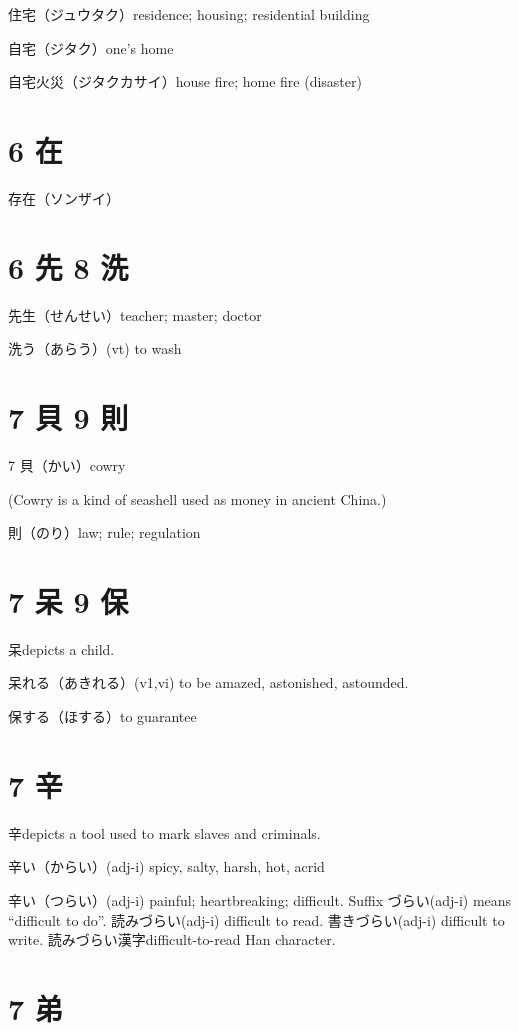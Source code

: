 住宅（ジュウタク）residence; housing; residential building

自宅（ジタク）one's home

自宅火災（ジタクカサイ）house fire; home fire (disaster)

\section{6 在}

存在（ソンザイ）

\section{6 先 8 洗}

先生（せんせい）teacher; master; doctor

洗う（あらう）(vt) to wash

\section{7 貝 9 則}

7 貝（かい）cowry

(Cowry is a kind of seashell used as money in ancient China.)

則（のり）law; rule; regulation

\section{7 呆 9 保}

呆depicts a child.

呆れる（あきれる）(v1,vi) to be amazed, astonished, astounded.

保する（ほする）to guarantee

\section{7 辛}

辛depicts a tool used to mark slaves and criminals.

辛い（からい）(adj-i) spicy, salty, harsh, hot, acrid

辛い（つらい）(adj-i) painful; heartbreaking; difficult.
Suffix づらい(adj-i) means ``difficult to do''.
読みづらい(adj-i) difficult to read.
書きづらい(adj-i) difficult to write.
読みづらい漢字difficult-to-read Han character.

\section{7 弟}

